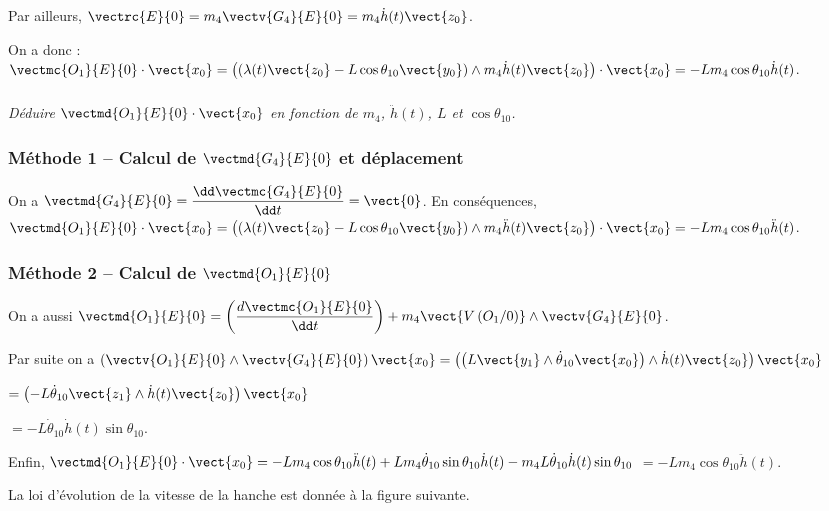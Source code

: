 \begin{multicols}{2}
\begin{corrige}
Par ailleurs, $\vectrc{E}{0}=m_4\vectv{G_4}{E}{0} = m_4\dot{h}(t)\vect{z_0}$. 

On a donc :
$ \vectmc{O_1}{E}{0}\cdot \vect{x_0} 
= \left(\left( \lambda(t)\vect{z_0}-L\cos\theta_{10}\vect{y_0}\right)\wedge m_4\dot{h}(t)\vect{z_0}\right) \cdot \vect{x_0}
=  -Lm_4\cos\theta_{10}\dot{h}(t)$.
 
 
\end{corrige}
\else
\fi




\subparagraph{} \textit{Déduire $\vectmd{O_1}{E}{0}\cdot \vect{x_0}$ en fonction de $m_4$, $\ddot{h}(t)$, $L$ et $\cos\theta_{10}$.}

\ifprof
\begin{corrige}
\subsubsection*{Méthode 1 -- Calcul de $\vectmd{G_4}{E}{0}$ et déplacement}
On a $\vectmd{G_4}{E}{0}= \dfrac{\dd \vectmc{G_4}{E}{0}}{\dd t}= \vect{0}$. En conséquences, 
$ \vectmd{O_1}{E}{0}\cdot \vect{x_0} 
= \left(\left( \lambda(t)\vect{z_0}-L\cos\theta_{10}\vect{y_0}\right)\wedge m_4\ddot{h}(t)\vect{z_0}\right) \cdot \vect{x_0} =  -Lm_4\cos\theta_{10}\ddot{h}(t)$.

\subsubsection*{Méthode 2 -- Calcul de $\vectmd{O_1}{E}{0}$}
On a aussi $\vectmd{O_1}{E}{0} = \left(\dfrac{d \vectmc{O_1}{E}{0}}{\dd t}\right)+m_4\vect{V\left(O_1/0\right)}\wedge\vectv{G_4}{E}{0} $. 

Par suite on a 
$\left(\vectv{O_1}{E}{0}\wedge\vectv{G_4}{E}{0}\right)\vect{x_0}=
\left(\left( L\vect{y_1}\wedge \dot{\theta}_{10} \vect{x_0} \right) \wedge\dot{h}(t)\vect{z_0}\right)\vect{x_0} $

$= \left( -L\dot{\theta}_{10} \vect{z_1} \wedge\dot{h}(t)\vect{z_0}\right)\vect{x_0} $ 

$= -L\dot{\theta}_{10} \dot{h}(t) \sin \theta_{10} $. 

Enfin, 
 $\vectmd{O_1}{E}{0}\cdot\vect{x_0}=-Lm_4\cos\theta_{10}\ddot{h}(t)+Lm_4\dot{\theta}_{10}\sin\theta_{10}\dot{h}(t)-m_4L\dot{\theta}_{10} \dot{h}(t) \sin \theta_{10}$
 $=-Lm_4\cos\theta_{10}\ddot{h}(t)$.
 
\end{corrige}

\else
\fi

\ifprof
\else
La loi d'évolution de la vitesse de la hanche est donnée à la figure suivante. 


\end{multicols}
